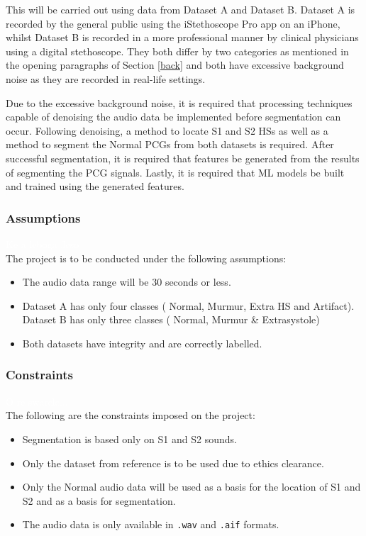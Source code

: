 \documentclass[10pt,twocolumn]{witseiepaper}
\begin{document}
This will be carried out using data from Dataset A and Dataset B. Dataset A is recorded by the general public using the iStethoscope Pro app on an iPhone, whilst Dataset B is recorded in a more professional manner by clinical physicians using a digital stethoscope. They both differ by two categories as mentioned in the opening paragraphs of Section \ref{back} and both have excessive background noise as they are recorded in real-life settings. 

Due to the excessive background noise, it is required that processing techniques capable of denoising the audio data be implemented before segmentation can occur. Following denoising, a method to locate S1 and S2 HSs as well as a method to segment the Normal PCGs from both datasets is required. After successful segmentation, it is required that features be generated from the results of segmenting the PCG signals. Lastly, it is required that ML models be built and trained using the generated features. 

\subsubsection{Assumptions}
\textcolor{white}{Ke a leboga Jeso}\\
The project is to be conducted under the following assumptions:
\begin{itemize}
    \item The audio data range will be 30 seconds or less.
    \item Dataset A has only four classes ( Normal, Murmur, Extra HS and Artifact). Dataset B has only three classes ( Normal, Murmur \& Extrasystole)
    \item Both datasets have integrity and are correctly labelled.
\end{itemize}

\subsubsection{Constraints}
\label{sec:constraints}
\textcolor{white}{O re swarele...}\\
The following are the constraints imposed on the project:
\begin{itemize}
    \item Segmentation is based only on S1 and S2 sounds.
    \item Only the dataset from reference \cite{bentley} is to be used due to ethics clearance.
    \item Only the Normal audio data will be used as a basis for the location of S1 and S2 and as a basis for segmentation.
    \item The audio data is only available in \texttt{.wav} and \texttt{.aif} formats.
\end{itemize}
\end{document}
